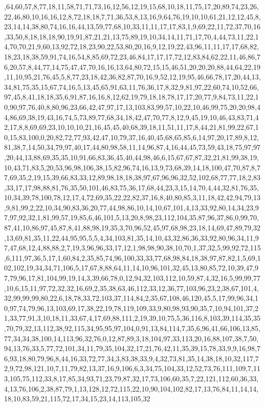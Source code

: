 \documentclass[11pt]{article}
\begin{document}
\begin{vncode}
,64,60,57,8,77,18,11,58,71,71,73,16,12,56,12,19,15,68,10,18,11,75,17,20,89,74,23,26,22,46,80,10,16,16,12,8,72,18,18,7,71,36,53,8,13,16,9,64,76,19,10,10,61,21,12,12,45,8,23,14,14,38,80,74,16,16,44,13,59,77,68,10,33,11,11,17,17,83,1,9,69,22,11,72,37,70,16,33,50,8,18,18,18,90,19,91,87,21,21,13,75,89,19,10,34,14,11,71,17,70,4,44,73,11,22,14,70,70,21,9,60,13,92,72,18,23,90,22,53,80,20,16,9,12,19,22,43,96,11,11,17,17,68,82,18,23,18,38,59,91,74,16,54,8,85,69,72,23,46,84,17,17,17,72,12,83,84,62,22,11,46,86,76,20,57,8,44,77,14,75,47,47,70,16,16,13,64,80,72,15,15,46,51,20,20,20,88,44,64,22,19,11,10,95,21,76,45,5,8,77,23,18,42,36,82,87,70,16,9,52,12,19,95,46,66,78,17,20,44,13,34,81,75,35,15,67,74,16,5,13,45,65,91,63,11,76,36,17,8,32,9,81,97,22,60,74,10,52,66,97,45,8,41,18,18,35,6,91,87,16,16,8,12,62,19,79,18,18,78,17,17,20,77,9,84,73,11,22,10,90,97,76,40,8,80,96,23,66,42,47,97,17,13,103,83,99,57,10,22,10,46,99,75,20,20,98,44,86,69,38,19,43,16,74,5,73,89,77,68,34,18,42,47,70,77,8,12,9,45,19,10,46,43,83,71,42,17,8,8,69,69,23,10,10,10,21,16,45,45,40,68,39,18,11,51,11,17,8,44,21,81,99,22,67,10,15,83,100,0,20,82,72,77,93,42,47,10,79,37,16,40,45,68,65,85,6,14,97,20,17,89,8,12,81,38,7,14,50,34,79,97,40,17,44,80,98,58,11,14,96,87,4,16,44,45,73,59,43,18,75,97,97,20,44,13,88,69,35,35,10,91,66,83,36,45,40,44,98,46,6,15,67,67,87,32,21,81,99,38,19,10,43,71,83,5,20,53,96,98,106,38,15,82,96,74,16,13,9,73,68,39,14,18,100,47,70,87,8,77,69,35,2,19,15,39,66,83,33,12,89,98,18,18,38,97,67,96,96,32,52,102,68,77,77,18,2,83,33,17,17,98,88,81,76,35,50,101,46,83,75,36,17,68,44,23,3,15,14,70,4,44,32,81,76,35,10,34,39,78,100,78,12,17,4,72,69,35,22,22,82,37,16,8,40,80,85,3,11,18,42,42,94,79,13,9,81,99,2,22,10,34,90,83,36,20,77,44,98,86,10,14,10,67,101,4,13,33,92,80,14,34,23,97,97,92,32,1,81,99,57,19,85,6,46,101,5,13,20,8,98,23,112,104,35,87,96,37,86,0,99,70,87,41,10,86,97,45,87,8,41,88,98,19,35,3,70,96,52,45,97,68,98,23,18,14,69,47,89,79,32,13,69,81,35,11,22,44,95,95,5,5,4,34,103,81,35,14,10,43,32,86,36,33,92,80,96,34,11,97,47,68,12,4,88,88,2,7,19,3,96,96,33,17,12,1,98,98,90,38,10,70,1,37,32,5,99,92,72,115,6,111,97,36,5,17,1,60,84,2,35,85,74,96,100,33,33,77,68,98,84,18,38,97,87,82,1,5,69,102,102,19,34,34,71,106,5,17,67,8,88,64,11,14,10,96,101,32,45,13,80,85,72,10,39,47,97,79,96,17,81,104,99,19,14,3,39,66,78,0,12,94,32,103,112,10,59,87,4,32,16,5,99,99,77,10,6,15,11,97,72,32,32,16,69,2,35,38,63,46,112,33,12,36,77,103,96,23,2,38,67,101,4,32,99,99,99,80,22,6,18,78,33,72,103,37,114,84,2,35,67,108,46,120,45,5,17,99,96,34,10,97,74,79,96,13,103,69,17,38,22,19,78,119,109,33,9,80,98,93,90,35,7,10,94,101,37,21,33,77,91,3,10,18,11,33,67,4,17,69,88,111,2,19,39,10,75,5,36,116,8,103,39,114,35,35,70,79,32,13,112,38,92,115,34,95,95,97,104,0,91,13,84,114,7,35,6,96,41,66,106,13,85,77,34,34,38,100,14,113,96,32,76,0,12,87,89,3,18,104,97,33,113,20,16,88,107,38,7,50,94,13,76,33,5,77,72,101,34,11,79,35,104,32,17,21,76,42,11,35,39,15,78,33,9,9,16,98,76,93,18,80,79,96,8,44,16,33,72,77,34,3,83,38,33,9,4,32,73,81,35,14,38,18,10,32,117,72,9,72,98,121,10,7,11,79,82,13,37,16,9,106,6,3,34,75,104,33,12,52,73,76,111,109,7,113,105,75,112,33,8,17,85,34,93,71,23,79,87,32,17,73,106,60,35,7,22,121,112,60,36,33,4,13,76,106,2,38,87,79,1,13,128,12,72,115,22,10,90,104,102,82,17,13,76,84,11,14,14,18,10,83,59,21,115,72,17,34,15,23,14,113,105,32
\end{vncode}
\end{document}
